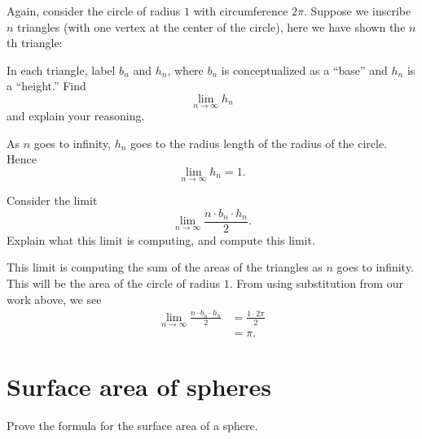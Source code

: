 \documentclass[newpage,hints,handout]{ximera}
\begin{document}
\begin{problem}
Again, consider the circle of radius $1$ with circumference $2\pi$.
Suppose we inscribe $n$ triangles (with one vertex at the center of
the circle), here we have shown the $n$th triangle:
\begin{image}
\end{image}
In each triangle, label $b_n$ and $h_n$, where $b_n$ is conceptualized
as a ``base'' and $h_n$ is a ``height.'' Find
\[
\lim_{n\to \infty} h_n
\]
and explain your reasoning.
\begin{freeResponse}
As $n$ goes to infinity, $h_n$ goes to the radius length of the radius
of the circle. Hence
\[
\lim_{n\to \infty} h_n = 1.
\]
\end{freeResponse}
\end{problem}


\begin{problem}
Consider the limit
\[
\lim_{n\to\infty} \frac{n\cdot b_n\cdot h_n}{2}.
\]
Explain what this limit is computing, and compute this limit.
\begin{freeResponse}
This limit is computing the sum of the areas of the triangles as $n$
goes to infinity. This will be the area of the circle of radius
$1$. From using substitution from our work above, we see
\begin{align*}
\lim_{n\to\infty} \frac{n\cdot b_n\cdot h_n}{2} &= \frac{1\cdot 2\pi}{2}\\
&=\pi.
\end{align*}
\end{freeResponse}
\end{problem}


\section{Surface area of spheres}
\begin{listOutcomes}
\item Prove the formula for the surface area of a sphere.
\end{listOutcomes}
\end{document}
